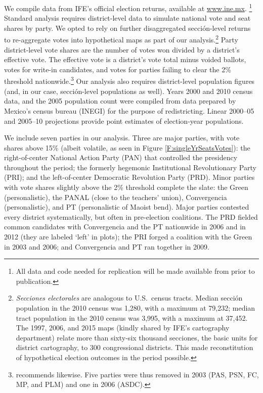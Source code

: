 \documentclass[letter,12pt]{article}
\begin{document}
We compile data from IFE's official election returns, available at \url{www.ine.mx}. \footnote{All data and code needed for replication will be made available from \citet{magar2015data} prior to publication.} Standard analysis requires district-level data to simulate national vote and seat shares by party. We opted to rely on further disaggregated secci\'on-level returns to re-aggregate votes into hypothetical maps as part of our analysis.\footnote{\emph{Secciones electorales} are analogous to U.S.\ census tracts. Median secci\'on population in the 2010 census was 1,280, with a maximum at 79,232; median tract population in the 2010 census was 3,995, with a maximum at 37,452. The 1997, 2006, and 2015 maps (kindly shared by IFE's cartography department) relate more than sixty-six thousand secciones, the basic units for district cartography, to 300 congressional districts. This made reconstitution of hypothetical election outcomes in the period possible.} Party district-level vote shares are the number of votes won divided by a district's effective vote. The effective vote is a district's vote total minus voided ballots, votes for write-in candidates, and votes for parties failing to clear the 2\% threshold nationwide.\footnote{\citet[][:fn. 4]{linzerSeatVoteElasticity2012} recommends likewise. Five parties were thus removed in 2003 (PAS, PSN, FC, MP, and PLM) and one in 2006 (ASDC).} Our analysis also requires district-level population figures (and, in our case, secci\'on-level populations as well). Years 2000 and 2010 census data, and the 2005 population count were compiled from data prepared by Mexico's census bureau (INEGI) for the purpose of redistricting. Linear 2000--05 and 2005--10 projections provide point estimates of election-year populations. 

We include seven parties in our analysis. Three are major parties, with vote shares above 15\% (albeit volatile, as seen in Figure \ref{F:singleYrSeatsVotes}): the right-of-center National Action Party (PAN) that controlled the presidency throughout the period; the formerly hegemonic Institutional Revolutionary Party (PRI); and the left-of-center Democratic Revolution Party (PRD). Minor parties with vote shares slightly above the 2\% threshold complete the slate: the Green (personalistic), the PANAL (close to the teachers' union), Convergencia (personalistic), and PT (personalistic of Maoist bend). Major parties contested every district systematically, but often in pre-election coalitions. The PRD fielded common candidates with Convergencia and the PT nationwide in 2006 and in 2012 (they are labeled `left' in plots); the PRI forged a coalition with the Green in 2003 and 2006; and Convergencia and PT ran together in 2009. 
\end{document}
